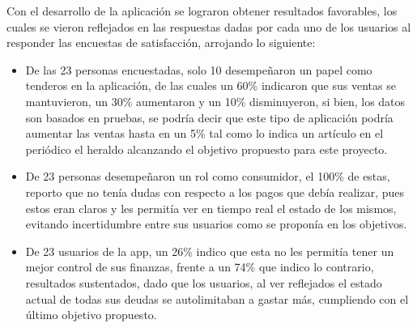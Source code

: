 Con el desarrollo de la aplicación se lograron obtener resultados favorables, los cuales se vieron reflejados en las respuestas dadas por cada uno de los usuarios al responder las encuestas de satisfacción, arrojando lo siguiente:

\begin{itemize}
	
	\item De las 23 personas encuestadas, solo 10 desempeñaron un papel como tenderos en la aplicación, de las cuales un 60\% indicaron que sus ventas se mantuvieron, un 30\% aumentaron y un 10\% disminuyeron, si bien, los datos son basados en pruebas, se podría decir que este tipo de aplicación podría aumentar las ventas hasta en un 5\% tal como lo indica un artículo en el periódico el heraldo \cite{LupeTrust} alcanzando el objetivo propuesto para este proyecto.
	
	\item De 23 personas desempeñaron un rol como consumidor, el 100\% de estas, reporto que no tenía dudas con respecto a los pagos que debía realizar, pues estos eran claros y les permitía ver en tiempo real el estado de los mismos, evitando incertidumbre entre sus usuarios como se proponía en los objetivos.
	
	\item De 23 usuarios de la app, un 26\% indico que esta no les permitía tener un mejor control de sus finanzas, frente a un 74\% que indico lo contrario, resultados sustentados, dado que los usuarios, al ver reflejados el estado actual de todas sus deudas se autolimitaban a gastar más, cumpliendo con el último objetivo propuesto.
	
\end{itemize}